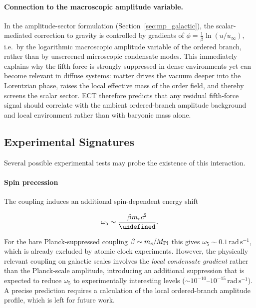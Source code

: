 \documentclass[11pt,a4paper]{article}
\let\hbar\undefined
\numberwithin{equation}{section}
\begin{document}
\paragraph{Connection to the macroscopic amplitude variable.}
In the amplitude-sector formulation
(Section~\ref{sec:mp_galactic}), the scalar-mediated
correction to gravity is controlled by gradients of
$\phi=\frac{1}{\beta}\ln(u/u_\infty)$, i.e.\ by the logarithmic macroscopic amplitude
variable of the ordered branch, rather than by unscreened microscopic
condensate modes.  This immediately explains why the fifth
force is strongly suppressed in dense environments yet can
become relevant in diffuse systems: matter drives the vacuum
deeper into the Lorentzian phase, raises the local effective
mass of the order field, and thereby screens the scalar sector.
ECT therefore predicts that any residual fifth-force signal
should correlate with the ambient ordered-branch amplitude background
and local environment rather than with baryonic mass alone.

\subsection{Experimental Signatures}

Several possible experimental tests may probe the existence of this
interaction.

\paragraph{Spin precession}

The coupling induces an additional spin-dependent energy shift

\begin{equation}
\omega_5
\sim
\frac{\beta m_e c^2}{\hbar}.
\end{equation}

For the bare Planck-suppressed coupling $\beta \sim m_e/M_{\rm Pl}$
this gives $\omega_5 \sim 0.1\,\mathrm{rad\,s^{-1}}$, which is 
already excluded by atomic clock experiments.  However, the 
physically relevant coupling on galactic scales involves the 
\emph{local condensate gradient} rather than the Planck-scale 
amplitude, introducing an additional suppression that is expected 
to reduce $\omega_5$ to experimentally interesting levels
($\sim 10^{-10}$--$10^{-15}\,\mathrm{rad\,s^{-1}}$).
A precise prediction requires a calculation of the local 
ordered-branch amplitude profile, which is left for future work.
\end{document}

